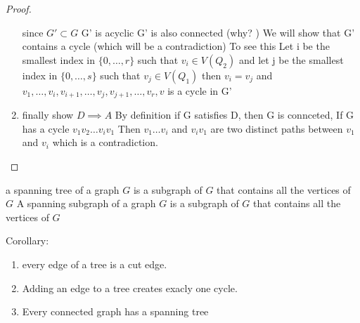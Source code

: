 \documentclass{article}
\begin{document}
\begin{theorem}
\begin{proof}
\begin{enumerate}
            since $G' \subset G$ G' is acyclic G' is also connected (why? ) We will show that G' contains a cycle (which will be a contradiction) To see this Let i be the smallest index in $\{0, \dots, r\}$ such that $v_i \in V(Q_2)$ and let j be the smallest index in $\{0, \dots, s\}$ such that $v_j \in V(Q_1)$ then $v_i = v_j$ and $v_1, \dots, v_i, v_{i+1}, \dots, v_j, v_{j+1}, \dots, v_r, v$ is a cycle in G'
            \item finally show $D \implies A$ By definition if G satisfies D, then G is connceted, If G has a cycle $v_1v_2\dots v_iv_1$ Then $v_1 \dots v_i$ and $v_i v_1$ are two distinct paths between $v_1$ and $v_i$ which is a contradiction.
        \end{enumerate}
        
    \end{proof}
    
\end{theorem}
\begin{definition}
    a spanning tree of a graph $G$ is a subgraph of $G$ that contains all the vertices of $G$
    A spanning subgraph of a graph $G$ is a subgraph of $G$ that contains all the vertices of $G$
\end{definition}

Corollary: 
    \begin{enumerate}
        \item every edge of a tree is a cut edge.
        \item Adding an edge to a tree creates exacly one cycle. 
        \item Every connected graph has a spanning tree 
    \end{enumerate}
\end{document}
